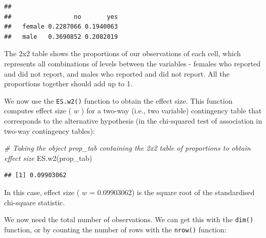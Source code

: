 \documentclass[
]{book}
\newenvironment{Shaded}{\begin{snugshade}}{\end{snugshade}}
\newcommand{\CommentTok}[1]{\textcolor[rgb]{0.56,0.35,0.01}{\textit{#1}}}
\newcommand{\FunctionTok}[1]{\textcolor[rgb]{0.00,0.00,0.00}{#1}}
\newcommand{\NormalTok}[1]{#1}
\newcommand{\OtherTok}[1]{\textcolor[rgb]{0.56,0.35,0.01}{#1}}
\newcommand{\SpecialCharTok}[1]{\textcolor[rgb]{0.00,0.00,0.00}{#1}}
\begin{document}
\begin{Shaded}
\end{Shaded}

\begin{verbatim}
##         
##                 no       yes
##   female 0.2287066 0.1940063
##   male   0.3690852 0.2082019
\end{verbatim}

The 2x2 table shows the proportions of our observations of each cell, which represents all combinations of levels between the variables - females who reported and did not report, and males who reported and did not report. All the proportions together should add up to 1.

We now use the \texttt{ES.w2()} function to obtain the effect size. This function computes effect size ( \(w\) ) for a two-way (i.e., two variable) contingency table that corresponds to the alternative hypothesis (in the chi-squared test of association in two-way contingency tables):

\begin{Shaded}
\begin{Highlighting}[]
\CommentTok{\# Taking the object \textquotesingle{}prop\_tab\textquotesingle{} containing the 2x2 table of proportions to obtain effect size}
\FunctionTok{ES.w2}\NormalTok{(prop\_tab)}
\end{Highlighting}
\end{Shaded}

\begin{verbatim}
## [1] 0.09903062
\end{verbatim}

In this case, effect size ( \(w\) = 0.09903062) is the square root of the standardised chi-square statistic.

We now need the total number of observations. We can get this with the \texttt{dim()} function, or by counting the number of rows with the \texttt{nrow()} function:
\end{document}
